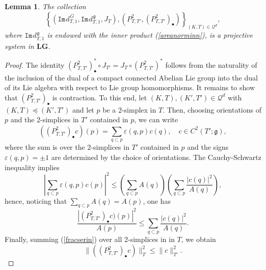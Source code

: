 \documentclass[10pt,a4paper]{amsart}
\newtheorem{lemma}{Lemma}
\begin{document}
\begin{lemma}
The collection
\begin{equation}\label{prpjistll}
	\left\{(\mathtt{Im}\hspace{1pt}d_{T,1}^{\hspace{1pt}G},\mathtt{Im}\hspace{1pt}d_{T,1}^{\hspace{1pt}\mathfrak g},J_T),( P^2_{T,T'},(P^2_{T,T'})_{\bullet})\right\}_{(K,T) \in \mathcal{Q}^d},
\end{equation} 
where $\mathtt{Im}\hspace{1pt}d_{T,1}^{\hspace{1pt}\mathfrak g}$ is endowed with the inner product (\ref{areanorminn}),    is a projective system in $\mathbf{LG}$.
\end{lemma}

\begin{proof}
The identity $(P^2_{T,T'})^*_{\bullet}\circ J_{T'} =J_{T}\circ (P^2_{T,T'})^*$  follows from the naturality of the inclusion of the dual of a compact connected Abelian Lie group into the dual of its Lie algebra with respect to Lie group homomorphisms. It remains to show that $(P^2_{T,T'})_{\bullet}$ is  contraction. To this end, let $(K,T), (K',T') \in \mathcal{Q}^d$ with $(K,T)\preceq (K',T')$ and let $p$ be a 2-simplex in $T$. Then, choosing orientations of $p$ and the 2-simplices in $T'$ contained in $p$, we can write
$$
((P^2_{T,T'})_{\bullet}c)(p)=\sum_{q\subset p}\varepsilon(q,p)c(q), \quad c \in C^2(T';\mathfrak{g}),
$$
where the sum is over the 2-simplices in $T'$ contained in $p$ and the signs $\varepsilon(q,p)=\pm 1$ are determined by the choice of orientations. The Cauchy-Schwartz inequality implies
$$
\left|\sum_{q\subset p}\varepsilon(q,p)c(p)\right|^2
\leq
\left(\sum_{q\subset p}A(q)\right)
\left(\sum_{q\subset p}\frac{|c(q)|^2}{A(q)}\right),
$$
hence, noticing that $\sum_{q\subset p}A(q)=A(p)$, one has 
\begin{equation}\label{fracserin}
\frac{|(P^2_{T,T'})_{\bullet}c)(p)|^2}{A(p)}
\leq
\sum_{q\subset p}\frac{|c(q)|^2}{A(q)}.
\end{equation}
Finally, summing (\ref{fracserin}) over all 2-simplices in in $T$, we obtain  
$$\|((P^2_{T,T'})_{\bullet}c)\|^2_{T} \leq \|c\|^2_{T'}.$$
\end{proof}
\end{document}
